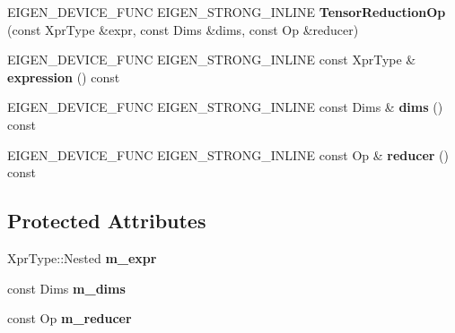 \begin{DoxyCompactItemize}
\item 
\mbox{\label{class_eigen_1_1_tensor_reduction_op_a214ada0344528eada5fb7523d67381da}} 
E\+I\+G\+E\+N\+\_\+\+D\+E\+V\+I\+C\+E\+\_\+\+F\+U\+NC E\+I\+G\+E\+N\+\_\+\+S\+T\+R\+O\+N\+G\+\_\+\+I\+N\+L\+I\+NE {\bfseries Tensor\+Reduction\+Op} (const Xpr\+Type \&expr, const Dims \&dims, const Op \&reducer)
\item 
\mbox{\label{class_eigen_1_1_tensor_reduction_op_a5ae90ea3a6efb6fd49171598fd47158d}} 
E\+I\+G\+E\+N\+\_\+\+D\+E\+V\+I\+C\+E\+\_\+\+F\+U\+NC E\+I\+G\+E\+N\+\_\+\+S\+T\+R\+O\+N\+G\+\_\+\+I\+N\+L\+I\+NE const Xpr\+Type \& {\bfseries expression} () const
\item 
\mbox{\label{class_eigen_1_1_tensor_reduction_op_a1ddfefe2973adf8509faccae887417ec}} 
E\+I\+G\+E\+N\+\_\+\+D\+E\+V\+I\+C\+E\+\_\+\+F\+U\+NC E\+I\+G\+E\+N\+\_\+\+S\+T\+R\+O\+N\+G\+\_\+\+I\+N\+L\+I\+NE const Dims \& {\bfseries dims} () const
\item 
\mbox{\label{class_eigen_1_1_tensor_reduction_op_a0106ac777bdc6db703aaf02fe4e1874f}} 
E\+I\+G\+E\+N\+\_\+\+D\+E\+V\+I\+C\+E\+\_\+\+F\+U\+NC E\+I\+G\+E\+N\+\_\+\+S\+T\+R\+O\+N\+G\+\_\+\+I\+N\+L\+I\+NE const Op \& {\bfseries reducer} () const
\end{DoxyCompactItemize}
\subsection*{Protected Attributes}
\begin{DoxyCompactItemize}
\item 
\mbox{\label{class_eigen_1_1_tensor_reduction_op_a8f45f01c272e545d449044413d1f7785}} 
Xpr\+Type\+::\+Nested {\bfseries m\+\_\+expr}
\item 
\mbox{\label{class_eigen_1_1_tensor_reduction_op_a5cfa60114fbf6edde5ffcbf90c0576e1}} 
const Dims {\bfseries m\+\_\+dims}
\item 
\mbox{\label{class_eigen_1_1_tensor_reduction_op_ab72aca11cbcd5009971528bfbc20749d}} 
const Op {\bfseries m\+\_\+reducer}
\end{DoxyCompactItemize}
